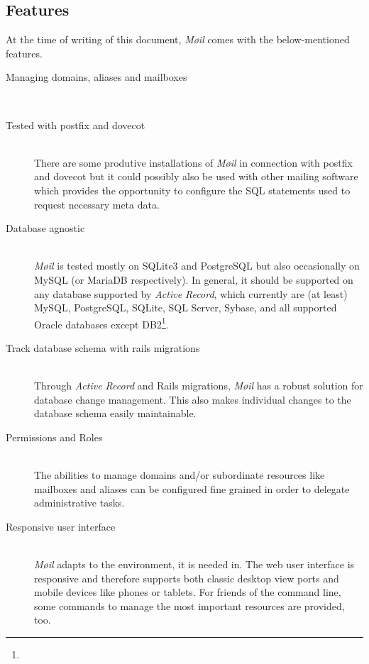 \documentclass[12pt,a4paper]{scrartcl}
\begin{document}


		\subsection*{Features}
		\label{sec:moeil:features}
			At the time of writing of this document, \emph{Møil} comes with the
			below-mentioned features.

			\begin{description}
				\item[\rm Managing domains, aliases and mailboxes]\ \\
					\todo

				\item[\rm Tested with postfix and dovecot]\ \\
					There are some produtive installations of \emph{Møil} in
					connection with postfix and dovecot but it could possibly
					also be used with other mailing software which provides the
					opportunity to configure the \ac{SQL} statements used to
					request necessary meta data.
				
				\item[\rm Database agnostic]\ \\
					\emph{Møil} is tested mostly on SQLite3 and PostgreSQL but
					also occasionally on MySQL (or MariaDB respectively). In
					general, it should be supported on any database supported
					by \emph{Active Record}, which currently are (at least)
					MySQL, PostgreSQL, SQLite, SQL Server, Sybase, and all
					supported Oracle databases except
					DB2\footnote{\urlARSupport}.

				\item[\rm Track database schema with rails migrations]\ \\
					Through \emph{Active Record} and \ac{Rails} migrations,
					\emph{Møil} has a robust solution for database change
					management. This also makes individual changes to the
					database schema easily maintainable.

				\item[\rm Permissions and Roles]\ \\
					The abilities to manage domains and/or subordinate resources
					like mailboxes and aliases can be configured fine grained
					in order to delegate administrative tasks.

				\item[\rm Responsive user interface]\ \\
					\emph{Møil} adapts to the environment, it is needed in. The
					web user interface is responsive and therefore supports
					both classic desktop view ports and mobile devices like
					phones or tablets. For friends of the command line, some
					commands to manage the most important resources are
					provided, too.


\end{description}
\end{document}
